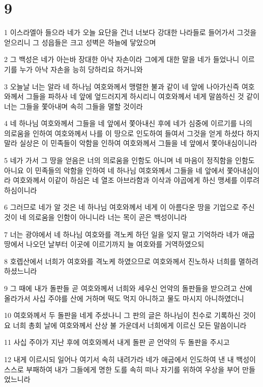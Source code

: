 \chapter{9}

\par 1 이스라엘아 들으라 네가 오늘 요단을 건너 너보다 강대한 나라들로 들어가서 그것을 얻으리니 그 성읍들은 크고 성벽은 하늘에 닿았으며
\par 2 그 백성은 네가 아는바 장대한 아낙 자손이라 그에게 대한 말을 네가 들었나니 이르기를 누가 아낙 자손을 능히 당하리요 하거니와
\par 3 오늘날 너는 알라 네 하나님 여호와께서 맹렬한 불과 같이 네 앞에 나아가신즉 여호와께서 그들을 파하사 네 앞에 엎드러지게 하시리니 여호와께서 네게 말씀하신 것 같이 너는 그들을 쫓아내며 속히 그들을 멸할 것이라
\par 4 네 하나님 여호와께서 그들을 네 앞에서 쫓아내신 후에 네가 심중에 이르기를 나의 의로움을 인하여 여호와께서 나를 이 땅으로 인도하여 들여서 그것을 얻게 하셨다 하지 말라 실상은 이 민족들이 악함을 인하여 여호와께서 그들을 네 앞에서 쫓아내심이니라
\par 5 네가 가서 그 땅을 얻음은 너의 의로움을 인함도 아니며 네 마음이 정직함을 인함도 아니요 이 민족들의 악함을 인하여 네 하나님 여호와께서 그들을 네 앞에서 쫓아내심이라 여호와께서 이같이 하심은 네 열조 아브라함과 이삭과 야곱에게 하신 맹세를 이루려 하심이니라
\par 6 그러므로 네가 알 것은 네 하나님 여호와께서 네게 이 아름다운 땅을 기업으로 주신 것이 네 의로움을 인함이 아니니라 너는 목이 곧은 백성이니라
\par 7 너는 광야에서 네 하나님 여호와를 격노케 하던 일을 잊지 말고 기억하라 네가 애굽 땅에서 나오던 날부터 이곳에 이르기까지 늘 여호와를 거역하였으되
\par 8 호렙산에서 너희가 여호와를 격노케 하였으므로 여호와께서 진노하사 너희를 멸하려 하셨느니라
\par 9 그 때에 내가 돌판들 곧 여호와께서 너희와 세우신 언약의 돌판들을 받으려고 산에 올라가서 사십 주야를 산에 거하며 떡도 먹지 아니하고 물도 마시지 아니하였더니
\par 10 여호와께서 두 돌판을 네게 주셨나니 그 판의 글은 하나님이 친수로 기록하신 것이요 너희 총회 날에 여호와께서 산상 불 가운데서 너희에게 이르신 모든 말씀이니라
\par 11 사십 주야가 지난 후에 여호와께서 내게 돌판 곧 언약의 두 돌판을 주시고
\par 12 내게 이르시되 일어나 여기서 속히 내려가라 네가 애굽에서 인도하여 낸 내 백성이 스스로 부패하여 내가 그들에게 명한 도를 속히 떠나 자기를 위하여 우상을 부어 만들었느니라

